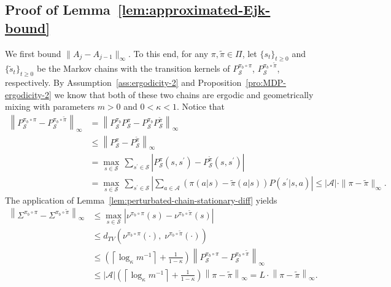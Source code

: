 \documentclass[10pt]{article}
\newcommand{\calA}{\mathcal{A}}
\newcommand{\calS}{\mathcal{S}}
\newcommand{\ls}{\left}
\newcommand{\rs}{\right}
\theoremstyle{plain}
\theoremstyle{definition}
\begin{document}
\subsection{Proof of Lemma~\ref{lem:approximated-Ejk-bound}}
\label{sec:pf:lem:approximated-Ejk-bound}
We first bound $\| A_j - A_{j-1} \|_\infty$. To this end, for any $\pi, \tilde \pi \in \Pi$, let $\{ s_t \}_{t\geq0}$ and $\{ \tilde s_t \}_{t\geq 0}$ be the Markov chains with the transition kernels of $P^{\pi_b\circ\pi}_{\scriptscriptstyle\calS}$, $P^{\pi_b\circ\tilde\pi}_{\scriptscriptstyle\calS}$, respectively. By Assumption~\ref{ass:ergodicity-2} and Proposition~\ref{pro:MDP-ergodicity-2} we know that both of these two chains are ergodic and geometrically mixing with parameters $m > 0$ and $0 < \kappa < 1$. 
Notice that
\begin{align*}
    \ls\| P^{\pi_b\circ\pi}_{\scriptscriptstyle\calS} - P^{\pi_b\circ\tilde\pi}_{\scriptscriptstyle\calS} \rs\|_\infty &= \ls\| P^{\pi_b}_{\scriptscriptstyle\calS}P^{\pi}_{\scriptscriptstyle\calS} - P^{\pi_b}_{\scriptscriptstyle\calS}P^{\tilde\pi}_{\scriptscriptstyle\calS} \rs\|_\infty \\
    &\leq \ls\| P^{\pi}_{\scriptscriptstyle\calS} - P^{\tilde\pi}_{\scriptscriptstyle\calS} \rs\|_\infty \\
    &= \max_{s\in\calS} \, \sum_{s^\prime \in \calS} \ls| P^\pi_{\scriptscriptstyle\calS}(s,s^\prime) - P^{\tilde\pi}_{\scriptscriptstyle\calS}(s,s^\prime) \rs| \\
    &= \max_{s\in\calS} \, \sum_{s^\prime \in \calS} \ls| \sum_{a\in\calA} \ls(\pi(a|s) - \tilde\pi(a|s)\rs) P(s^\prime | s,a) \rs| \leq |\calA| \cdot \| \pi - \tilde\pi \|_\infty.
\end{align*}
The application of Lemma~\ref{lem:perturbated-chain-stationary-diff} yields
\begin{align*}
    \ls\| \Sigma^{\pi_b\circ\pi} - \Sigma^{\pi_b\circ\tilde\pi} \rs\|_\infty &\leq  \max_{s\in\calS} \ls| \nu^{\pi_b\circ\pi}(s) - \nu^{\pi_b\circ\tilde\pi}(s) \rs| \\
    &\leq d_{TV}(\nu^{\pi_b\circ\pi}(\cdot), \; \nu^{\pi_b\circ\tilde\pi}(\cdot))\\
    &\leq \ls( \ls\lceil \log_\kappa m^{-1} \rs\rceil + \frac{1}{1-\kappa} \rs) \ls\| P^{\pi_b\circ\pi}_{\scriptscriptstyle\calS} - P^{\pi_b\circ\tilde\pi}_{\scriptscriptstyle\calS} \rs\|_\infty \\
    &\leq |\calA|\ls( \ls\lceil \log_\kappa m^{-1} \rs\rceil + \frac{1}{1-\kappa} \rs) \ls\| \pi - \tilde\pi \rs\|_\infty = L\cdot \ls\| \pi - \tilde\pi \rs\|_\infty.
\end{align*}
\end{document}

